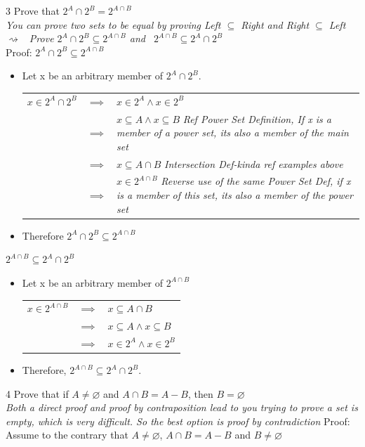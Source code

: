 \documentclass[12pt, letterpaper]{article}
\newcommand{\exheader}[1][ex]{{\tiny{#1}\normalsize}}
\begin{document}
\exheader[3] Prove that $2^A \cap 2^B = 2^{A \cap B}$
\\ {\small \emph{You can prove two sets to be equal by proving Left $\subseteq$ Right and Right $\subseteq$ Left \\ $\rightsquigarrow$ \ Prove $2^A \cap 2^B \subseteq 2^{A \cap B}$ and \ $2^{A \cap B} \subseteq 2^A \cap 2^B$}}
\\ Proof:
\smallbreak $2^A \cap 2^B \subseteq 2^{A \cap B}$ \vspace*{-0.25cm}
\begin{itemize}[leftmargin=*, label={}]
	\item Let x be an arbitrary member of $2^A \cap 2^B$. \\
	\begin{tabular}{l l l}
		$x \in 2^A \cap 2^B$ & $\implies$ & $x \in 2^A \land x \in 2^B$ \\
		& $\implies$ & $x \subseteq A \land x \subseteq B$ {\tiny \emph{Ref Power Set Definition, If x is a member of a power set, its also a member of the main set}} \\
		& $ \implies $ & $x \subseteq A \cap B$ {\tiny \emph{Intersection Def-kinda ref examples above}} \\
		& $ \implies $ & $x \in 2^{A \cap B}$ {\tiny\emph{Reverse use of the same Power Set Def, if x is a member of this set, its also a member of the power set}}
	\end{tabular}
	\item Therefore $2^A \cap 2^B \subseteq 2^{A \cap B}$
\end{itemize} \smallbreak

$2^{A \cap B} \subseteq 2^A \cap 2^B$ \vspace*{-0.25cm}
\begin{itemize}[leftmargin=*, label={}]
	\item Let x be an arbitrary member of $2^{A \cap B}$ \\
	\begin{tabular}{l l l}
		$ x \in 2^{A \cap B}$ & $\implies$& $x \subseteq A \cap B$ \\
		& $\implies$ & $x \subseteq A \land x \subseteq B$ \\
		& $\implies$ & $x \in 2^A \land x \in 2^B$
	\end{tabular}
	\item Therefore, $2^{A \cap B} \subseteq 2^A \cap 2^B$.
\end{itemize}

\bigbreak
\exheader[4] Prove that if $A \not = \varnothing$ and $A \cap B = A - B$, then $B = \varnothing$
\\ {\small \emph{Both a direct proof and proof by contraposition lead to you trying to prove a set is empty, which is very difficult. So the best option is proof by contradiction}}
\smallbreak Proof: 
\\ Assume to the contrary that {\small $A \not = \varnothing$, $A \cap B = A - B$ and $B \not =\varnothing$}
\end{document}
